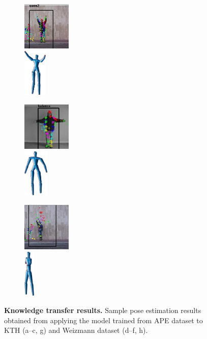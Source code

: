 \begin{figure}
\begin{subfigure}[t]{0.18\linewidth}
		\label{fig/body/others/e}
	\end{subfigure}
	\begin{subfigure}[t]{0.18\linewidth} \centering
		\includegraphics[height=2.3cm]{fig/body/others/weiz2.jpg} \\
		\includegraphics[height=2.3cm]{fig/body/others/weiz2.png} 
		\label{fig/body/others/f}
	\end{subfigure}
	\begin{subfigure}[t]{0.18\linewidth} \centering
		\includegraphics[height=2.3cm]{fig/body/others/ktherr.jpg} \\
		\includegraphics[height=2.3cm]{fig/body/others/ktherr.png} 
		\label{fig/body/others/g}
	\end{subfigure}
	\begin{subfigure}[t]{0.18\linewidth} \centering
		\includegraphics[height=2.3cm]{fig/body/others/weizerr.jpg} \\
		\includegraphics[height=2.3cm]{fig/body/others/weizerr.png} 
		\label{fig/body/others/h}
	\end{subfigure}
	\caption{\textbf{Knowledge transfer results.} Sample pose estimation results obtained from applying the model trained from APE dataset to KTH (a--c, g) and Weizmann dataset (d--f, h).} 
	\label{fig/body/otherresults}
\end{figure}


